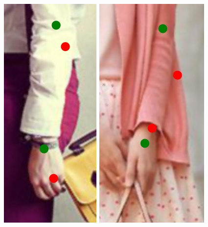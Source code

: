 \begin{figure}
    \includegraphics[height=\fh]{resources/Annotation_Correction/Fixing/fix_10}
    \hfill
    \includegraphics[height=\fh]{resources/Annotation_Correction/Fixing/fix_20}
    \hfill

\end{figure}

